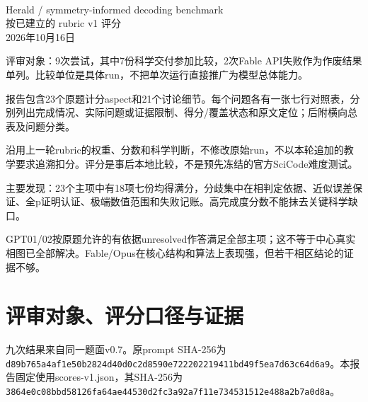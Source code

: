 \documentclass[11pt,a4paper]{article}
\begin{document}
\fontsize{10.5}{15.2}\selectfont

\begin{center}\vspace*{12mm}{\LARGE\bfseries 七份有效 AI 交付\\[4mm]逐项比较研究报告}\\[6mm]{\large Herald / symmetry-informed decoding benchmark}\\[3mm]{\large 按已建立的 rubric v1 评分}\\[5mm]2026年10月16日\end{center}
评审对象：9次尝试，其中7份科学交付参加比较，2次Fable API失败作为作废结果单列。比较单位是具体run，不把单次运行直接推广为模型总体能力。

报告包含23个原题计分aspect和21个讨论细节。每个问题各有一张七行对照表，分别列出完成情况、实际问题或证据限制、得分/覆盖状态和原文定位；后附横向总表及问题分类。

沿用上一轮rubric的权重、分数和科学判断，不修改原始run，不以本轮追加的教学要求追溯扣分。评分是事后本地比较，不是预先冻结的官方SciCode难度测试。

主要发现：23个主项中有18项七份均得满分，分歧集中在相判定依据、近似误差保证、全p证明认证、极端数值范围和失败记账。高完成度分数不能抹去关键科学缺口。

GPT01/02按原题允许的有依据unresolved作答满足全部主项；这不等于中心真实相图已全部解决。Fable/Opus在核心结构和算法上表现强，但若干相区结论的证据不够。

\clearpage
\tableofcontents
\clearpage
\section{评审对象、评分口径与证据}
九次结果来自同一题面v0.7。原prompt SHA-256为 \nolinkurl{d89b765a4af1e50b2824d40d0c2d8590e722202219411bd49f5ea7d63c64d6a9}。本报告固定使用scores-v1.json，其SHA-256为 \nolinkurl{3864e0c08bbd58126fa64ae44530d2fc3a92a7f11e734531512e488a2b7a0d8a}。
\end{document}
